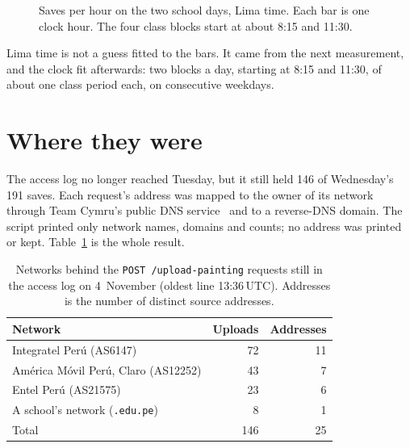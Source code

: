 \documentclass[10pt,letterpaper,twocolumn]{article}
\begin{document}
\begin{figure}[t]
\centering
{}
\caption{Saves per hour on the two school days, Lima time. Each bar is
one clock hour. The four class blocks start at about 8:15 and 11:30.}
\label{fig:hours}
\end{figure}

Lima time is not a guess fitted to the bars. It came from the next
measurement, and the clock fit afterwards: two blocks a day, starting at
8:15 and 11:30, of about one class period each, on consecutive weekdays.

\section{Where they were}
\label{sec:where}

The access log no longer reached Tuesday, but it still held 146 of
Wednesday's 191 saves. Each request's address was mapped to the owner
of its network through Team Cymru's public DNS service~\citep{cymru2026asn}
and to a reverse-DNS domain. The script printed only network names,
domains and counts; no address was printed or kept. Table~\ref{tab:nets}
is the whole result.

\begin{table}[t]
\centering\small
\caption{Networks behind the \texttt{POST /upload-painting} requests
still in the access log on 4~November (oldest line 13:36\,UTC). Addresses
is the number of distinct source addresses.}
\label{tab:nets}
\begin{tabular}{@{}lrr@{}}
\toprule
Network & Uploads & Addresses \\
\midrule
Integratel Per\'u (AS6147) & 72 & 11 \\
Am\'erica M\'ovil Per\'u, Claro (AS12252) & 43 & 7 \\
Entel Per\'u (AS21575) & 23 & 6 \\
A school's network (\texttt{.edu.pe}) & 8 & 1 \\
\midrule
Total & 146 & 25 \\
\bottomrule
\end{tabular}
\end{table}
\end{document}
